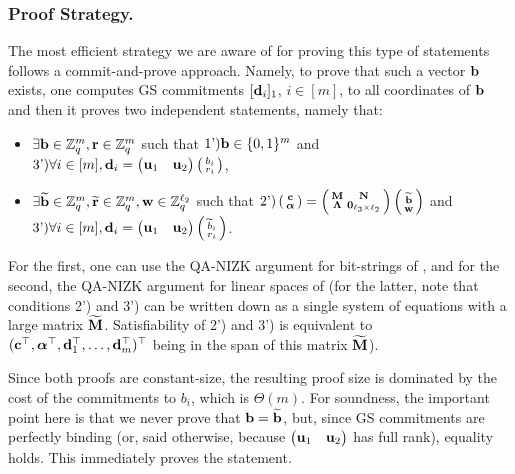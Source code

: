 \subsubsection{Proof Strategy.} The most efficient strategy we are aware of for proving this type of statements follows a 
 commit-and-prove approach. Namely, to prove that such a vector $\mathbf{b}$ exists, one computes 
GS commitments $[\mathbf{d}_i]_1$, $i \in [m]$, to all coordinates of $\mathbf{b}$ and then it proves two independent statements, namely that:
\vspace{-0.2cm}
\begin{itemize}
\item $\exists \mathbf{b}\in \mathbb{Z}_q^{m}, \mathbf{r} \in \mathbb{Z}_q^m$ such that  
$\text{1')} \mathbf{b}\in \{0,1\}^{m}$ and $\text{3')} \forall i \in [{m}], \mathbf{d}_i=\begin{pmatrix} \mathbf{u}_1 &   \mathbf{u}_2 \end{pmatrix}   \left(\begin{smallmatrix}b_i  \\ r_i\end{smallmatrix}\right)$,
\item   $\exists \widetilde{\mathbf{b}} \in \mathbb{Z}_q^{m},  \widetilde{\mathbf{r}} \in \mathbb{Z}_q^m, \mathbf{w} \in\mathbb{Z}_q^{\ell_2}$ such that  
   $\text{2')} \left(\begin{smallmatrix}
    \mathbf{c}\\
    {\boldsymbol \alpha}
\end{smallmatrix}\right)
=
\left(\begin{smallmatrix}
    \mathbf{{M}}       & \mathbf{{N}}\\
    \mathbf{{\Lambda}} & \mathbf{{0}}_{{\ell_3}\times {\ell_2}}
\end{smallmatrix}\right)
\left(\begin{smallmatrix}
    \widetilde{\mathbf{b}}\\
    \mathbf{w}
\end{smallmatrix}\right)$ and $\text{3')} \forall i \in [m], \mathbf{d}_i=\begin{pmatrix} \mathbf{u}_1 &   \mathbf{u}_2 \end{pmatrix}   \left(\begin{smallmatrix}
\widetilde{b}_i  \\ r_i\end{smallmatrix}\right)$.
\end{itemize}
For the first, one can use the QA-NIZK argument for bit-strings of \cite{AC:GonHevRaf15}, and for the second, the QA-NIZK argument for linear spaces of \cite{C:JutRoy14,EC:KilWee15} (for the latter, note that conditions 2') and 3') can be written down as a single system of equations with a large matrix $\widetilde{\mathbf{{M}}}$. Satisfiability of 
2') and 3') is equivalent to  $(\mathbf{c}^{\top},{\boldsymbol \alpha}^{\top},\mathbf{d}_1^{\top}, \ldots, \mathbf{d}_m^{\top})^\top$ being in the span 
of this matrix $\widetilde{\mathbf{{M}}}$).

Since both proofs are constant-size, the resulting proof size is dominated by the cost of the commitments to $b_i$, which is $\Theta(m)$. 
For soundness, the important point here is that we never prove that $\mathbf{b}=\widetilde{\mathbf{b}}$, but, since GS commitments are perfectly binding (or, said otherwise, because $\begin{pmatrix} \mathbf{u}_1 &   \mathbf{u}_2 \end{pmatrix}$
has full rank), equality holds. This immediately proves the statement.  

